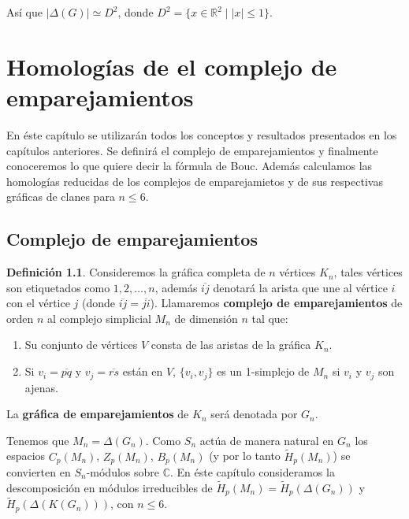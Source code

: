 \documentclass[12pt]{book}
\theoremstyle{definition}
\newtheorem{definition}[theorem]{Definición}
\newcounter{in}
\newcounter{ini}
\begin{document}
Así que $|\Delta(G)|\simeq D^{2}$, donde $D^{2}=\{x\in\mathbb{R}^{2}
\mid |x|\leq 1\}$. 

\chapter[Homologías de $M_{n}$ y $K(M_{n})$]{Homologías de el complejo de emparejamientos}
\label{cha:hom-com-emp}

En éste capítulo se utilizarán todos los conceptos y resultados
presentados en los capítulos anteriores. Se definirá el complejo de
emparejamientos y finalmente conoceremos lo que quiere decir la
fórmula de Bouc. Además calculamos las homologías reducidas de los
complejos de emparejamietos y de sus respectivas gráficas de clanes para
$n\leq 6$.

\section{Complejo de emparejamientos}
\label{complejo-emparejamientos}
\begin{definition}
Consideremos la gráfica completa de $n$ vértices $K_{n}$, tales
vértices son etiquetados como $1,2,\ldots,n$, además
$\overline{ij}$ denotará la arista que une al vértice $i$ con el
vértice $j$ (donde $\overline{ij}=\overline{ji}$). Llamaremos \textbf{complejo de emparejamientos} de orden
$n$ al complejo simplicial $M_{n}$ de dimensión $n$ tal que:

\begin{enumerate}
  \item Su conjunto de vértices $V$ consta de las aristas de la gráfica
  $K_{n}$. 

  \item Si $v_{i}=\overline{pq}$ y $v_{j}=\overline{rs}$ están en
  $V$, $\{v_{i},v_{j}\}$ es  un 1-simplejo de $M_{n}$ si $v_{i}$
  y $v_{j}$ son ajenas.
\end{enumerate} 
La \textbf{gráfica de emparejamientos} de $K_{n}$ será denotada por $G_{n}$.
\end{definition}

Tenemos que $M_{n}=\Delta(G_{n})$. Como $S_{n}$ actúa de manera
natural en $G_{n}$ los espacios $C_{p}(M_{n})$, $Z_{p}(M_{n})$,
$B_{p}(M_{n})$ (y por lo tanto $\widetilde H_{p}(M_{n})$) se convierten en
$S_{n}$-módulos sobre $\mathbb{C}$. En éste capítulo consideramos
la descomposición en módulos irreducibles de
$\widetilde H_{p}(M_{n})=\widetilde H_{p}(\Delta(G_{n}))$ y
$\widetilde H_{p}(\Delta(K(G_{n})))$, con $n\leq 6$.
\end{document}
